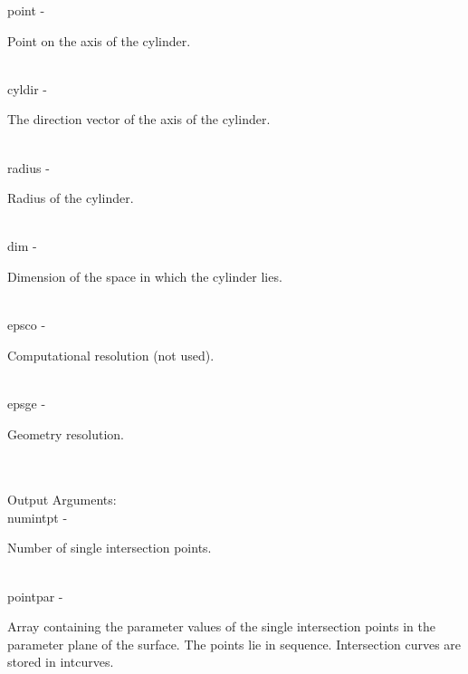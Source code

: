         \>\>    {\fov point}\> - \>     \begin{minipg2}
                                Point on the axis of the cylinder.
                                \end{minipg2}\\
        \>\>    {\fov cyldir}\> - \>    \begin{minipg2}
                                The direction vector of the axis of the cylinder.
                                \end{minipg2}\\
        \>\>    {\fov radius}\> - \>    \begin{minipg2}
                                Radius of the cylinder.
                                \end{minipg2}\\
        \>\>    {\fov dim}\> - \>       \begin{minipg2}
                                Dimension of the space in which the cylinder lies.
                                \end{minipg2}\\
        \>\>    {\fov epsco}\> - \>     \begin{minipg2}
                                Computational resolution (not used).
                                \end{minipg2}\\
        \>\>    {\fov epsge}\> - \>     \begin{minipg2}
                                Geometry resolution.
                                \end{minipg2}\\
\\
        \>Output Arguments:\\
        \>\>    {\fov numintpt}\> - \>  \begin{minipg2}
                                Number of single intersection points.
                                \end{minipg2}\\
        \>\>    {\fov pointpar}\> - \>  \begin{minipg2}
                                Array containing the parameter values of the single
                                intersection points in the parameter plane of the
                                surface. The points lie in sequence. Intersection curves
                                are stored in intcurves.
                                \end{minipg2}\\[0.8ex]
